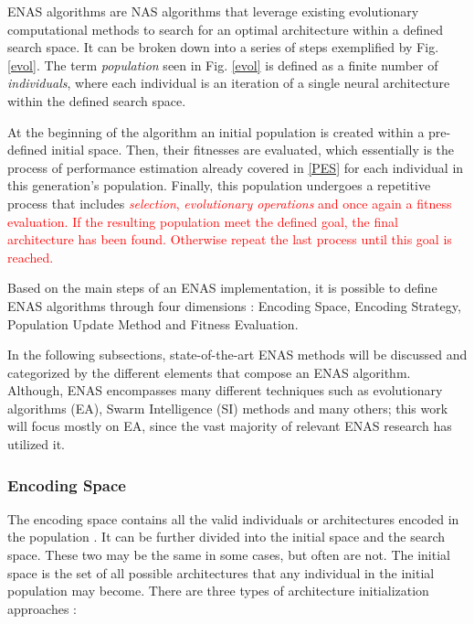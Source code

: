 \documentclass[10pt,        %
               a4paper,     %
               journal,     %
               ]{IEEEtran}
\begin{document}
ENAS algorithms are NAS algorithms that leverage existing evolutionary computational methods
to search for an optimal architecture within a defined search space. It can be broken
down into a series of steps exemplified by Fig. \ref{evol}. The term \textit{population} seen
in Fig. \ref{evol} is defined as a finite number of \textit{individuals}, where each individual
is an iteration of a single neural architecture within the defined  search space.

At the beginning of the algorithm an initial population is created within a pre-defined initial space.
Then, their fitnesses are evaluated, which essentially is the process of performance estimation already covered in \ref{PES}
for each individual in this generation's population. Finally, this population undergoes a repetitive process that
includes
\textcolor{red} {
\textit{selection}, \textit{evolutionary operations} and once again a fitness evaluation. If the resulting
population meet the defined goal, the final architecture has been found. Otherwise repeat the last process until this
goal is reached.
}

Based on the main steps of an ENAS implementation, it is possible to define ENAS algorithms
through four dimensions \cite{liu2021survey}: Encoding Space, Encoding Strategy, Population Update Method and
Fitness Evaluation.

In the following subsections, state-of-the-art ENAS methods will be discussed and categorized by the
different elements that compose an ENAS algorithm. Although, ENAS encompasses many different
techniques such as evolutionary algorithms (EA), Swarm Intelligence (SI) methods and many others;
this work will focus mostly on EA, since the vast majority of relevant ENAS research has utilized it.

\subsubsection{Encoding Space}
The encoding space contains all the valid individuals or architectures encoded in the population \cite{liu2021survey}.
It can be further divided into the initial space and the search space. These two may be the same in some cases,
but often are not. The initial space is the set of all possible architectures that any individual in the initial population may
become. There are three types of architecture initialization approaches \cite{liu2021survey}:
\end{document}
